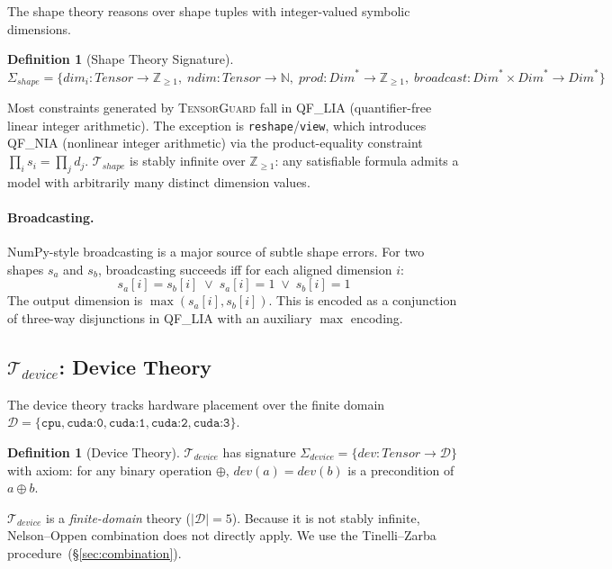 \documentclass[10pt]{article}
\newcommand{\tguard}{\textsc{TensorGuard}}
\newcommand{\Tshape}{\mathcal{T}_{\mathit{shape}}}
\newcommand{\Tdevice}{\mathcal{T}_{\mathit{device}}}
\theoremstyle{plain}
\theoremstyle{definition}
\newtheorem{definition}[theorem]{Definition}
\theoremstyle{remark}
\begin{document}
The shape theory reasons over shape tuples with
integer-valued symbolic dimensions.

\begin{definition}[Shape Theory Signature]
$\Sigma_{\mathit{shape}} = \{
  \mathit{dim}_i : \mathit{Tensor} \to \mathbb{Z}_{\geq 1},\;
  \mathit{ndim} : \mathit{Tensor} \to \mathbb{N},\;
  \mathit{prod} : \mathit{Dim}^* \to \mathbb{Z}_{\geq 1},\;
  \mathit{broadcast} : \mathit{Dim}^* \times \mathit{Dim}^* \to
    \mathit{Dim}^*
\}$
\end{definition}

Most constraints generated by \tguard{} fall in QF\_LIA
(quantifier-free linear integer arithmetic).  The exception is
\texttt{reshape}/\texttt{view}, which introduces QF\_NIA (nonlinear
integer arithmetic) via the product-equality constraint
$\prod_i s_i = \prod_j d_j$.  $\Tshape$ is stably infinite over
$\mathbb{Z}_{\geq 1}$: any satisfiable formula admits a model with
arbitrarily many distinct dimension values.

\paragraph{Broadcasting.}
NumPy-style broadcasting is a major source of subtle shape errors.
For two shapes $s_a$ and $s_b$, broadcasting succeeds iff for each
aligned dimension $i$:
\[
  s_a[i] = s_b[i] \;\lor\; s_a[i] = 1 \;\lor\; s_b[i] = 1
\]
The output dimension is $\max(s_a[i], s_b[i])$.  This is encoded
as a conjunction of three-way disjunctions in QF\_LIA with an
auxiliary $\max$ encoding.

\subsection{$\Tdevice$: Device Theory}\label{sec:tdevice}

The device theory tracks hardware placement over the finite domain
$\mathcal{D} = \{\texttt{cpu}, \texttt{cuda:0}, \texttt{cuda:1},
\texttt{cuda:2}, \texttt{cuda:3}\}$.

\begin{definition}[Device Theory]
$\Tdevice$ has signature
$\Sigma_{\mathit{device}} = \{
  \mathit{dev} : \mathit{Tensor} \to \mathcal{D}
\}$
with axiom: for any binary operation $\oplus$,
$\mathit{dev}(a) = \mathit{dev}(b)$ is a precondition of
$a \oplus b$.
\end{definition}

$\Tdevice$ is a \emph{finite-domain} theory ($|\mathcal{D}| = 5$).
Because it is not stably infinite, Nelson--Oppen combination does not
directly apply.  We use the Tinelli--Zarba
procedure~(\S\ref{sec:combination}).
\end{document}
